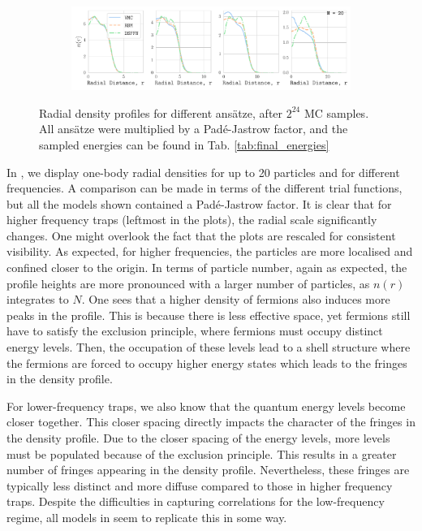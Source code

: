 \begin{figure}[H]
\begin{subfigure}[d]{0.8\textwidth}
    \end{subfigure}
    \begin{subfigure}[e]{0.8\textwidth}
        \centering
        \includegraphics[width=1.0\textwidth]{Chapters/Results/dots/radial_profile_N[20]_nqs_all.pdf}
        \label{fig:total_n6}
    \end{subfigure}
    \caption{Radial density profiles for different ansätze, after $2^{24}$ MC samples. All ansätze were multiplied by a Padé-Jastrow factor, and the sampled energies can be found in Tab. \ref{tab:final_energies}}
    \label{fig:one_body_densities}
\end{figure}


In , we display one-body radial densities for up to 20 particles and for different frequencies. A comparison can be made in terms of the different trial functions, but all the models shown contained a Padé-Jastrow factor. It is clear that for higher frequency traps (leftmost in the plots), the radial scale significantly changes. One might overlook the fact that the plots are rescaled for consistent visibility. As expected, for higher frequencies, the particles are more localised and confined closer to the origin. In terms of particle number, again as expected, the profile heights are more pronounced with a larger number of particles, as $n(r)$ integrates to $N$. One sees that a higher density of fermions also induces more peaks in the profile. This is because there is less effective space, yet fermions still have to satisfy the exclusion principle, where fermions must occupy distinct energy levels. Then, the occupation of these levels lead to a shell structure where the fermions are forced to occupy higher energy states which leads to the fringes in the density profile.

For lower-frequency traps, we also know that the quantum energy levels become closer together. This closer spacing directly impacts the character of the fringes in the density profile. Due to the closer spacing of the energy levels, more levels must be populated because of the exclusion principle. This results in a greater number of fringes appearing in the density profile. Nevertheless, these fringes are typically less distinct and more diffuse compared to those in higher frequency traps. Despite the difficulties in capturing correlations for the low-frequency regime, all models in  seem to replicate this in some way.

